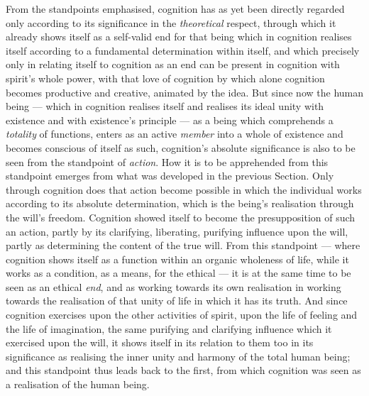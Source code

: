 \documentclass[12pt,a4paper]{book}
\begin{document}
From the standpoints emphasised, cognition has as yet been directly regarded
only according to its significance in the \emph{theoretical} respect, through
which it already shows itself as a self-valid end for that being which in
cognition realises itself according to a fundamental determination within
itself, and which precisely only in relating itself to cognition as an end can
be present in cognition with spirit's whole power, with that love of cognition
by which alone cognition becomes productive and creative, animated by the
idea. But since now the human being --- which in cognition realises itself and
realises its ideal unity with existence and with existence's principle --- as
a being which comprehends a \emph{totality} of functions, enters as an active
\emph{member} into a whole of existence and becomes conscious of itself as
such, cognition's absolute significance is also to be seen from the standpoint
of \emph{action}. How it is to be
apprehended from this standpoint emerges from what was developed in the
previous Section. Only through cognition does that action become possible in
which the individual works according to its absolute determination, which is
the being's realisation through the will's freedom. Cognition showed itself to
become the presupposition of such an action, partly by its clarifying,
liberating, purifying influence upon the will, partly as determining the
content of the true will. From this standpoint --- where cognition shows
itself as a function within an organic wholeness of life, while it works as a
condition, as a means, for the ethical --- it is at the same time to be seen
as an ethical \emph{end}, and as working towards its own realisation in
working towards the realisation of that unity of life in which it has its
truth. And since cognition exercises upon the other activities of spirit, upon
the life of feeling and the life of imagination, the same purifying and
clarifying influence which it exercised upon the will, it shows itself in its
relation to them too in its significance as realising the inner unity and
harmony of the total human being; and this standpoint thus leads back to the
first, from which cognition was seen as a realisation of the human being.
\end{document}
